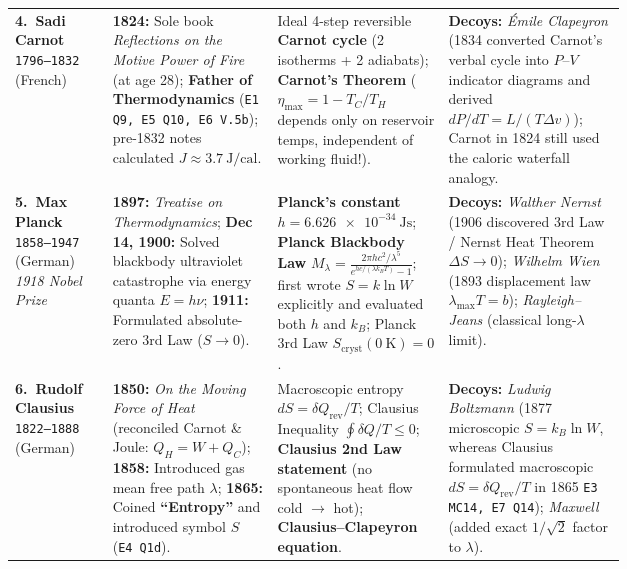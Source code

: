 {\begin{tabularx}{\linewidth}{@{}L{0.16\linewidth} L{0.27\linewidth} L{0.28\linewidth} X@{}}
\textbf{4.\ Sadi Carnot} \newline \texttt{1796--1832} (French) & \textbf{1824:} Sole book \textit{Reflections on the Motive Power of Fire} (at age 28); \textbf{Father of Thermodynamics} (\texttt{E1 Q9, E5 Q10, E6 V.5b}); pre-1832 notes calculated $J \approx \SI{3.7}{\joule\per\text{cal}}$. & Ideal 4-step reversible \textbf{Carnot cycle} (2 isotherms + 2 adiabats); \textbf{Carnot's Theorem} ($\eta_{\max} = 1 - T_C/T_H$ depends only on reservoir temps, independent of working fluid!). & \textbf{Decoys:} \textit{\'{E}mile Clapeyron} (1834 converted Carnot's verbal cycle into $P$--$V$ indicator diagrams and derived $dP/dT = L/(T\Delta v)$); Carnot in 1824 still used the caloric waterfall analogy. \\
\textbf{5.\ Max Planck} \newline \texttt{1858--1947} (German) \newline \textit{1918 Nobel Prize} & \textbf{1897:} \textit{Treatise on Thermodynamics}; \textbf{Dec 14, 1900:} Solved blackbody ultraviolet catastrophe via energy quanta $E = h\nu$; \textbf{1911:} Formulated absolute-zero 3rd Law ($S \to 0$). & \textbf{Planck's constant} $h = \SI{6.626e-34}{\joule\second}$; \textbf{Planck Blackbody Law} $M_\lambda = \frac{2\pi hc^2/\lambda^5}{e^{hc/(\lambda k_B T)}-1}$; first wrote $S = k\ln W$ explicitly and evaluated both $h$ and $k_B$; Planck 3rd Law $S_{\mathrm{cryst}}(\SI{0}{\kelvin}) = 0$. & \textbf{Decoys:} \textit{Walther Nernst} (1906 discovered 3rd Law / Nernst Heat Theorem $\Delta S \to 0$); \textit{Wilhelm Wien} (1893 displacement law $\lambda_{\max}T = b$); \textit{Rayleigh--Jeans} (classical long-$\lambda$ limit). \\
\textbf{6.\ Rudolf Clausius} \newline \texttt{1822--1888} (German) & \textbf{1850:} \textit{On the Moving Force of Heat} (reconciled Carnot \& Joule: $Q_H = W + Q_C$); \textbf{1858:} Introduced gas mean free path $\lambda$; \textbf{1865:} Coined \textbf{``Entropy''} and introduced symbol $S$ (\texttt{E4 Q1d}). & Macroscopic entropy $dS = \delta Q_{\mathrm{rev}}/T$; Clausius Inequality $\oint \delta Q/T \le 0$; \textbf{Clausius 2nd Law statement} (no spontaneous heat flow cold $\to$ hot); \textbf{Clausius--Clapeyron equation}. & \textbf{Decoys:} \textit{Ludwig Boltzmann} (1877 microscopic $S = k_B\ln W$, whereas Clausius formulated macroscopic $dS = \delta Q_{\mathrm{rev}}/T$ in 1865 \texttt{E3 MC14, E7 Q14}); \textit{Maxwell} (added exact $1/\sqrt{2}$ factor to $\lambda$). \\

\end{tabularx}}
